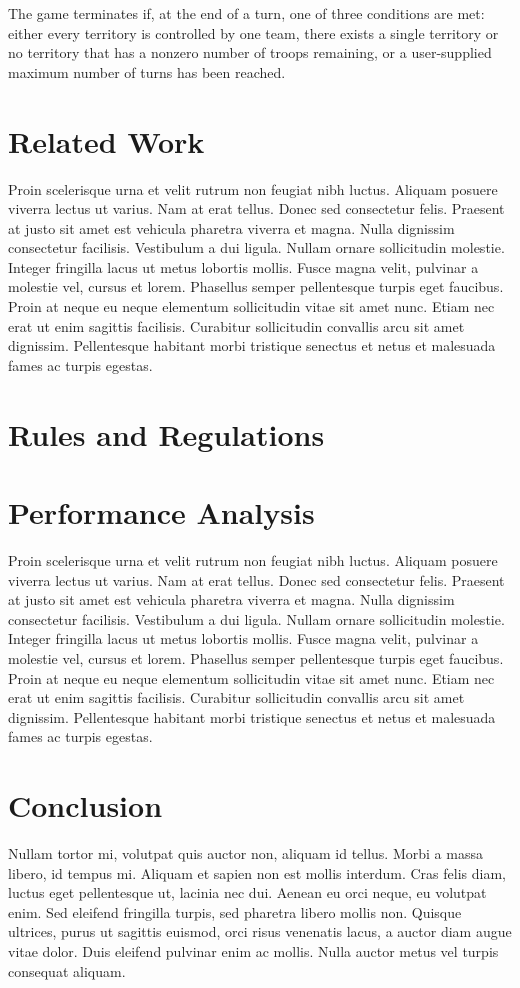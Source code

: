 \documentclass[10pt]{article}
\begin{document}
\begin{multicols}{2}
		The game terminates if, at the end of a turn, one of three conditions are met: either every territory is controlled by one team, there exists a single territory or no territory that has a nonzero number of troops remaining, or a user-supplied maximum number of turns has been reached.


		\section*{Related Work}
		Proin scelerisque urna et velit rutrum non feugiat nibh luctus. Aliquam posuere viverra lectus ut varius. Nam at erat tellus. Donec sed consectetur felis. Praesent at justo sit amet est vehicula pharetra viverra et magna. Nulla dignissim consectetur facilisis. Vestibulum a dui ligula. Nullam ornare sollicitudin molestie. Integer fringilla lacus ut metus lobortis mollis. Fusce magna velit, pulvinar a molestie vel, cursus et lorem. Phasellus semper pellentesque turpis eget faucibus. Proin at neque eu neque elementum sollicitudin vitae sit amet nunc. Etiam nec erat ut enim sagittis facilisis. Curabitur sollicitudin convallis arcu sit amet dignissim. Pellentesque habitant morbi tristique senectus et netus et malesuada fames ac turpis egestas.
		
		\section*{Rules and Regulations}
		

		
		
		\section*{Performance Analysis}
		Proin scelerisque urna et velit rutrum non feugiat nibh luctus. Aliquam posuere viverra lectus ut varius. Nam at erat tellus. Donec sed consectetur felis. Praesent at justo sit amet est vehicula pharetra viverra et magna. Nulla dignissim consectetur facilisis. Vestibulum a dui ligula. Nullam ornare sollicitudin molestie. Integer fringilla lacus ut metus lobortis mollis. Fusce magna velit, pulvinar a molestie vel, cursus et lorem. Phasellus semper pellentesque turpis eget faucibus. Proin at neque eu neque elementum sollicitudin vitae sit amet nunc. Etiam nec erat ut enim sagittis facilisis. Curabitur sollicitudin convallis arcu sit amet dignissim. Pellentesque habitant morbi tristique senectus et netus et malesuada fames ac turpis egestas.
		
		
		\section*{Conclusion}
		Nullam tortor mi, volutpat quis auctor non, aliquam id tellus. Morbi a massa libero, id tempus mi. Aliquam et sapien non est mollis interdum. Cras felis diam, luctus eget pellentesque ut, lacinia nec dui. Aenean eu orci neque, eu volutpat enim. Sed eleifend fringilla turpis, sed pharetra libero mollis non. Quisque ultrices, purus ut sagittis euismod, orci risus venenatis lacus, a auctor diam augue vitae dolor. Duis eleifend pulvinar enim ac mollis. Nulla auctor metus vel turpis consequat aliquam.
		

\end{multicols}
\end{document}
